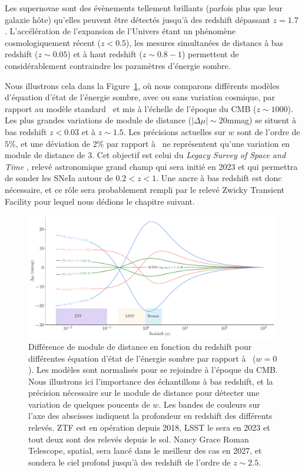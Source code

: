 \documentclass[../main/main.tex]{subfiles}
\begin{document}
Les supernovae sont des évènements tellement brillants (parfois plus que
leur galaxie hôte) qu'elles peuvent être détectés jusqu'à des redshift
dépassant $z=1.7$ \citep{Rubin2013, Jones2013}. L'accélération de
l'expansion de l'Univers étant un phénomène cosmologiquement récent
($z<0.5$), les mesures simultanées de distancs à bas redshift ($z\sim0.05$) et à
haut redshift ($z\sim0.8-1$) permettent de considérablement contraindre
les paramètres d'énergie sombre.

Nous illustrons cela dans la Figure~\ref{fig:evolv_DEstate}, où nous
comparons différents modèles d'équation d'état de l'énergie sombre, avec
ou sans variation cosmique, par rapport au modèle standard \lcdm\ et
mis à l'échelle de l'époque du CMB ($z\sim1000$). Les plus grandes
variations de module de distance ($\lvert\Delta\mu\rvert\sim20$mmag) se situent à bas
redshift $z<0.03$ et à $z\sim1.5$. Les précisions actuelles sur $w$ sont
de l'ordre de $5\%$, et une déviation de $2\%$ par rapport à \lcdm\ ne
représentent qu'une variation en module de distance de
$3$\textperthousand. Cet objectif est celui du \textit{Legacy Survey of Space and Time} \citep[LSST;][]{LSSTbook2}, relevé
astronomique grand champ qui sera initié en 2023 et qui permettra de
sonder les SNeIa autour de $0.2<z<1$. Une ancre à bas redshift est donc
nécessaire, et ce rôle sera probablement rempli par le relevé Zwicky
Transient Facility \citep[ZTF;][]{GrahamZTF2019,BellmZTF2019} pour
lequel nous dédions le chapitre suivant.

\begin{figure}[ht]
  \centering
  \includegraphics[width=0.99\textwidth]{../figures/01_cosmology/darkenergy_variation.pdf}
  \caption[Différence de module de distance en fonction du redshift pour
  différentes équation d'état de l'énergie sombre.]{Différence de module de distance en fonction du redshift pour
    différentes équation d'état de l'énergie sombre par rapport à \lcdm\
    ($w=0$). Les modèles sont normalisés pour se rejoindre à l'époque du
    CMB. Nous illustrons ici l'importance des échantillons à bas redshift,
    et la précision nécessaire sur le module de distance pour détecter une
    variation de quelques poucents de $w$. Les bandes de couleurs sur l'axe
    des abscisses indiquent la profondeur en redshift des différents
    relevés. ZTF est en opération depuis 2018, LSST le sera en 2023 et tout
    deux sont des relevés depuis le sol. Nancy Grace Roman Telescope, spatial, sera
    lancé dans le meilleur des cas en 2027, et sondera le ciel profond
    jusqu'à des redshift de l'ordre de $z\sim2.5$.} 
  \label{fig:evolv_DEstate}
\end{figure}
\end{document}
